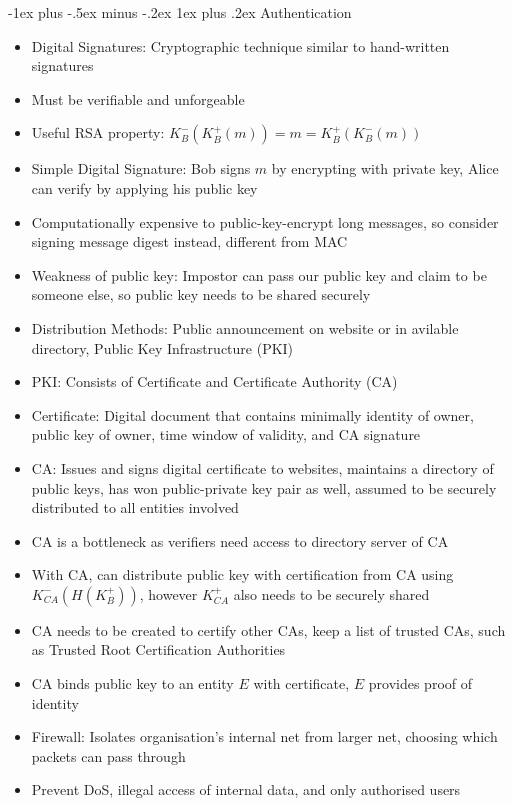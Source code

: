 \documentclass[10pt, landscape]{article}
\makeatletter
\renewcommand{\subsection}{\@startsection{subsection}{3}{0mm}%
                                {-1ex plus -.5ex minus -.2ex}%
                                {1ex plus .2ex}%
                                {\normalfont\small\bfseries}}%
\makeatother
\begin{document}
\begin{multicols*}{3}
\subsection{Authentication}
\begin{itemize}
    \item Digital Signatures: Cryptographic technique similar to hand-written signatures
    \item Must be verifiable and unforgeable
    \item Useful RSA property: $K_B^-(K_B^+(m))=m=K_B^+(K_B^-(m))$
    \item Simple Digital Signature: Bob signs $m$ by encrypting with private key, Alice can verify by applying his public key
    \item Computationally expensive to public-key-encrypt long messages, so consider signing message digest instead, different from MAC
    \item Weakness of public key: Impostor can pass our public key and claim to be someone else, so public key needs to be shared securely
    \item Distribution Methods: Public announcement on website or in avilable directory, Public Key Infrastructure (PKI)
    \item PKI: Consists of Certificate and Certificate Authority (CA)
    \item Certificate: Digital document that contains minimally identity of owner, public key of owner, time window of validity, and CA signature
    \item CA: Issues and signs digital certificate to websites, maintains a directory of public keys, has won public-private key pair as well, assumed to be securely distributed to all entities involved
    \item CA is a bottleneck as verifiers need access to directory server of CA
    \item With CA, can distribute public key with certification from CA using $K_{CA}^-(H(K_B^+))$, however $K_{CA}^+$ also needs to be securely shared
    \item CA needs to be created to certify other CAs, keep a list of trusted CAs, such as Trusted Root Certification Authorities
    \item CA binds public key to an entity $E$ with certificate, $E$ provides proof of identity
    \item Firewall: Isolates organisation's internal net from larger net, choosing which packets can pass through
    \item Prevent DoS, illegal access of internal data, and only authorised users

\end{itemize}
\end{multicols*}
\end{document}

